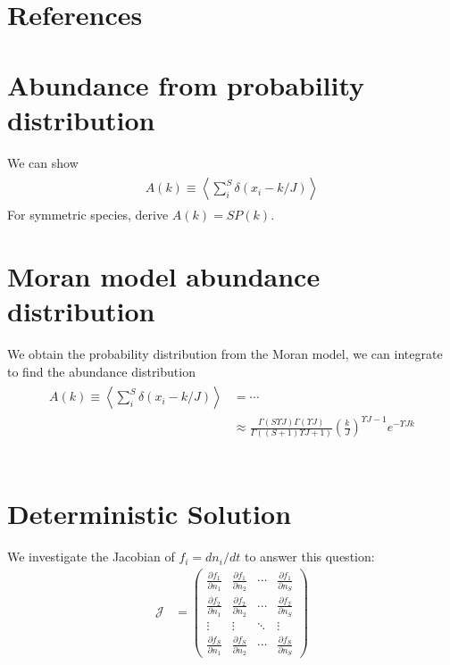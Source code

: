 \documentclass[11pt,a4paper,final]{iopart}
\begin{document}
\section*{References}

\newpage
{} %
\renewcommand{\theequation}{\thesection.\arabic{equation}} 

\begin{appendices}
\section{Abundance from probability distribution}
\label{prob-abund}
We can show
\begin{align}
\begin{split}
A(k) \equiv \left\langle \sum_i^S \delta(x_i-k/J) \right\rangle
\end{split}
\end{align}
For symmetric species, derive $A(k)=SP(k)$.

\section{Moran model abundance distribution}\label{antonderiv}
We obtain the probability distribution from the Moran model, we can integrate to find the abundance distribution
\begin{align}
\begin{split}
A(k) \equiv \left\langle \sum_i^S \delta(x_i-k/J) \right\rangle &= \cdots \\
&\approx \frac{\Gamma (S \Upsilon J) \Gamma (\Upsilon J)}{\Gamma ((S+1)\Upsilon J + 1)}\left(\frac{k}{J}\right)^{\Upsilon J - 1} e^{-\Upsilon J k}
\end{split}
\end{align}
\\
\section{Deterministic Solution}
We investigate the Jacobian of $f_i=dn_i/dt$ to answer this question:
\begin{align*}
\mathcal{J} &=
\begin{pmatrix}
\frac{\partial f_1}{\partial n_1} & \frac{\partial f_1}{\partial n_2} & \cdots & \frac{\partial f_1}{\partial n_S} \\
\frac{\partial f_2}{\partial n_1} & \frac{\partial f_2}{\partial n_2} & \cdots & \frac{\partial f_2}{\partial n_S} \\
\vdots & \vdots & \ddots & \vdots \\
\frac{\partial f_S}{\partial n_1} & \frac{\partial f_S}{\partial n_2} & \cdots & \frac{\partial f_S}{\partial n_S}
\end{pmatrix} 
\end{align*}
\end{appendices}
\end{document}
